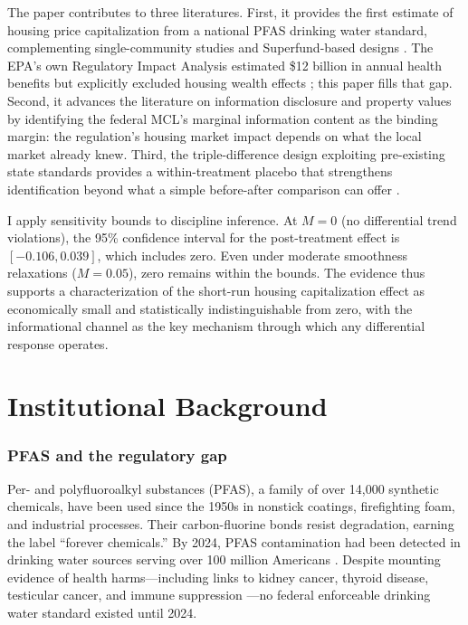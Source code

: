 \documentclass[12pt]{article}
\begin{document}
The paper contributes to three literatures. First, it provides the first estimate of housing price capitalization from a national PFAS drinking water standard, complementing single-community studies \citep{Marcus2024, Guignet2024} and Superfund-based designs \citep{Greenstone2006, Currie2015, Gamper2020}. The EPA's own Regulatory Impact Analysis estimated \$12 billion in annual health benefits but explicitly excluded housing wealth effects \citep{EPA2024RIA}; this paper fills that gap. Second, it advances the literature on information disclosure and property values \citep{Pope2008, Linden2008, Chay2005} by identifying the federal MCL's marginal information content as the binding margin: the regulation's housing market impact depends on what the local market already knew. Third, the triple-difference design exploiting pre-existing state standards provides a within-treatment placebo that strengthens identification beyond what a simple before-after comparison can offer \citep{RambachanRoth2023}.

I apply \citet{RambachanRoth2023} sensitivity bounds to discipline inference. At $M = 0$ (no differential trend violations), the 95\% confidence interval for the post-treatment effect is $[-0.106, 0.039]$, which includes zero. Even under moderate smoothness relaxations ($M = 0.05$), zero remains within the bounds. The evidence thus supports a characterization of the short-run housing capitalization effect as economically small and statistically indistinguishable from zero, with the informational channel as the key mechanism through which any differential response operates.

\section{Institutional Background}

\subsubsection*{PFAS and the regulatory gap} Per- and polyfluoroalkyl substances (PFAS), a family of over 14,000 synthetic chemicals, have been used since the 1950s in nonstick coatings, firefighting foam, and industrial processes. Their carbon-fluorine bonds resist degradation, earning the label ``forever chemicals.'' By 2024, PFAS contamination had been detected in drinking water sources serving over 100 million Americans \citep{Hu2021, Herron2024}. Despite mounting evidence of health harms---including links to kidney cancer, thyroid disease, testicular cancer, and immune suppression \citep{Post2012, Grandjean2022}---no federal enforceable drinking water standard existed until 2024.
\end{document}
